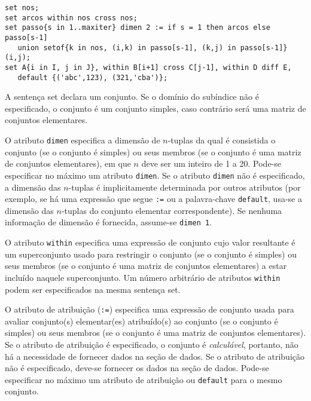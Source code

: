\documentclass[11pt, brazil]{report}
\def\para#1{\noindent{\bf#1}}
\begin{document}
\para{Exemplos}


\begin{verbatim}
set nos;
set arcos within nos cross nos;
set passo{s in 1..maxiter} dimen 2 := if s = 1 then arcos else passo[s-1]
   union setof{k in nos, (i,k) in passo[s-1], (k,j) in passo[s-1]}(i,j);
set A{i in I, j in J}, within B[i+1] cross C[j-1], within D diff E,
   default {('abc',123), (321,'cba')};
\end{verbatim}


A sentença set declara um conjunto. Se o domínio do subíndice não é
especificado, o conjunto é um conjunto simples, caso contrário será
uma matriz de conjuntos elementares.

O atributo {\tt dimen} especifica a dimensão de $n$-tuplas da qual é
consistida o conjunto (se o conjunto é simples) ou seus membros
(se o conjunto é uma matriz de conjuntos elementares),
em que $n$ deve ser um inteiro de 1 a 20. Pode-se especificar
no máximo um atributo {\tt dimen}. Se o atributo {\tt dimen} não é
especificado, a dimensão das $n$-tuplas é implicitamente determinada
por outros atributos (por exemplo, se há uma expressão que segue
{\tt:=} ou a palavra-chave {\tt default}, usa-se a dimensão das $n$-tuplas
do conjunto elementar correspondente).
Se nenhuma informação de dimensão é fornecida, assume-se
{\tt dimen 1}.

O atributo {\tt within} especifica uma expressão de conjunto cujo
valor resultante é um superconjunto usado para restringir o conjunto
(se o conjunto é simples) ou seus membros (se o conjunto é uma matriz
de conjuntos elementares) a estar incluído naquele superconjunto.
Um número arbitrário de atributos {\tt within} podem ser especificados
na mesma sentença set.

O atributo de atribuição ({\tt:=}) especifica uma expressão de conjunto
usada para avaliar conjunto(s) \linebreak elementar(es) atribuído(s) ao conjunto
(se o conjunto é simples) ou seus membros (se o conjunto é uma matriz
de conjuntos elementares). Se o atributo de atribuição é especificado,
o conjunto é {\it calculável}, portanto, não há a necessidade de fornecer
dados na seção de dados. Se o atributo de atribuição não é especificado,
deve-se fornecer os dados na seção de dados. Pode-se especificar no
máximo um atributo de atribuição ou {\tt default} para o mesmo conjunto.
\end{document}
